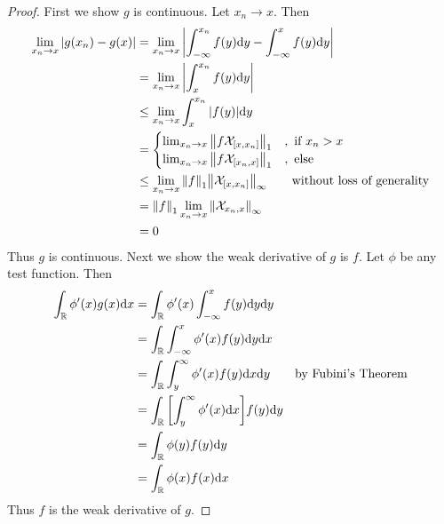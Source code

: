 \documentclass{article} %
\theoremstyle{plain}
\def\Rl{\mathbb{R}}
\numberwithin{equation}{section} %
\numberwithin{figure}{section} %
\numberwithin{table}{section} %
\begin{document}
\begin{proof}
    First we show $g$ is continuous.  Let $x_n \rightarrow x$.  Then
    \begin{align*}
        \lim_{x_n \rightarrow x}\abs{g(x_n) - g(x)} &= \lim_{x_n \rightarrow x} \abs{\int_{-\infty}^{x_n}f(y) \dd y - \int_{-\infty}^x f(y) \dd y}\\
        &= \lim_{x_n\rightarrow x} \abs{\int_x^{x_n} f(y) \dd y} \\
        &\leq \lim_{x_n \rightarrow x}\int_x^{x_n}\abs{f(y)} \dd y \\
        &= \begin{cases}
            \lim_{x_n \rightarrow x}\norm{f\mathcal{X}_{[x,x_n]}}_1 &,\ \text{if } x_n > x \\
            \lim_{x_n \rightarrow x}\norm{f\mathcal{X}_{[x_n,x]}}_1 &,\ \text{else}
        \end{cases} \\
        &\leq \lim_{x_n \rightarrow x}\norm{f}_1\norm{\mathcal{X}_{[x,x_n]}}_\infty \qquad \text{without loss of generality} \\
        &= \norm{f}_1 \lim_{x_n \rightarrow x} \norm{\mathcal{X}_{x_n,x}}_\infty \\
        &= 0
    \end{align*}
    Thus $g$ is continuous.  Next we show the weak derivative of $g$ is $f$.  Let $\phi$ be any test function.  Then
    \begin{align*}
        \int_\Rl \phi'(x) g(x) \dd x &= \int_\Rl \phi'(x) \int_{-\infty}^x f(y) \dd y \dd y \\
        &= \int_\Rl \int_{-\infty}^x \phi'(x)f(y) \dd y \dd x \\
        &= \int_\Rl \int_y^\infty \phi'(x) f(y) \dd x \dd y \qquad \text{by Fubini's Theorem} \\
        &= \int_\Rl \qty[\int_y^\infty \phi'(x) \dd x] f(y) \dd y \\
        &= \int_\Rl \phi(y) f(y) \dd y \\
        &= \int_\Rl \phi(x) f(x) \dd x
    \end{align*}
    Thus $f$ is the weak derivative of $g$.
\end{proof}
\end{document}
